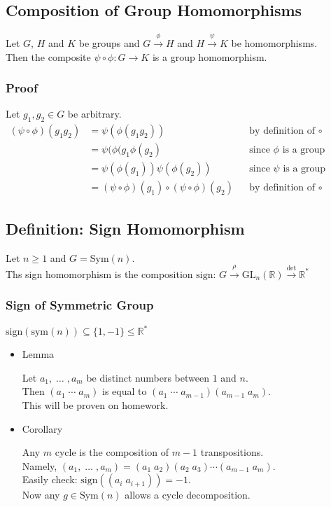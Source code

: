 \documentclass[11pt]{article}
\newcommand{\0}{\emptyset}
\newcommand{\R}{\mathbb{R}}
\begin{document}
\subsection*{Composition of Group Homomorphisms}
\label{sec:orgc2dd0cd}
Let \(G\), \(H\) and \(K\) be groups and \(G\overset{\phi}{\to}H\) and \(H\overset{\psi}{\to}K\) be homomorphisms.\\[0pt]
Then the composite \(\psi\circ\phi:G\to K\) is a group homomorphism.\\[0pt]
\subsubsection*{Proof}
\label{sec:org6f3b64c}
Let \(g_{1},g_{2}\in G\) be arbitrary.\\[0pt]
\begin{align*}
  (\psi\circ\phi)(g_{1}g_{2})
  &=\psi(\phi(g_{1}g_{2})) && \text{by definition of }\circ
  \\&=\psi(\phi(g_{1}\phi(g_{2}) && \text{since $\phi$ is a group homomorphism}
  \\&=\psi(\phi(g_{1}))\psi(\phi(g_{2})) && \text{since $\psi$ is a group homomorphism}
  \\&=(\psi\circ\phi)(g_{1})\circ(\psi\circ\phi)(g_{2}) && \text{by definition of }\circ
\end{align*}
\subsection*{Definition: Sign Homomorphism}
\label{sec:orga3cb670}
Let \(n\geq1\) and \(G=\text{Sym}(n)\).\\[0pt]
Ths sign homomorphism is the composition \(\text{sign: }G\overset{\rho}{\to}\text{GL}_{n}(\R)\overset{\det}{\to}\R^{*}\)\\[0pt]
\subsubsection*{Sign of Symmetric Group}
\label{sec:org83265c5}
\(\text{sign}(\text{sym}(n))\subseteq\{1,-1\}\leq\R^{*}\)\\[0pt]
\begin{itemize}
\item Lemma
\label{sec:org511c518}

Let \(a_{1},\;\ldots\;,a_{m}\) be distinct numbers between \(1\) and \(n\).\\[0pt]
Then \((a_{1}\;\cdots\;a_{m})\) is equal to \((a_{1}\;\cdots\;a_{m-1})(a_{m-1}\;a_{m})\).\\[0pt]
This will be proven on homework.\\[0pt]
\item Corollary
\label{sec:orgbbf3b7d}

Any \(m\) cycle is the composition of \(m-1\) transpositions.\\[0pt]
Namely, \((a_{1},\;\ldots\;,a_{m})=(a_{1}\;a_{2})(a_{2}\;a_{3})\cdots(a_{m-1}\;a_{m})\).\\[0pt]
Easily check: \(\text{sign}((a_{i}\;a_{i+1}))=-1\).\\[0pt]
Now any \(g\in\text{Sym}(n)\) allows a cycle decomposition.\\[0pt]
\end{itemize}
\end{document}
